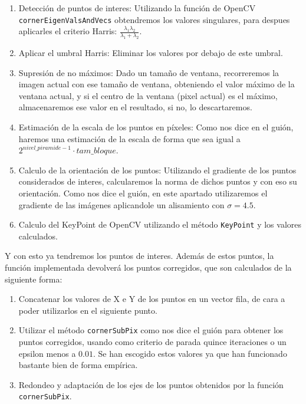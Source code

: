 \documentclass[12pt, spanish]{article}
\begin{document}
\begin{enumerate}
	\item Detección de puntos de interes: Utilizando la función de OpenCV \texttt{cornerEigenValsAndVecs}\cite{cornerCV} obtendremos los valores singulares, para despues aplicarles el criterio Harris: $\frac{\lambda_{1} \lambda_{2}}{\lambda_{1} + \lambda_{2}}$.
	\item Aplicar el umbral Harris: Eliminar los valores por debajo de este umbral.
	\item Supresión de no máximos: Dado un tamaño de ventana, recorreremos la imagen actual con ese tamaño de ventana, obteniendo el valor máximo de la ventana actual, y si el centro de la ventana (pixel actual) es el máximo, almacenaremos ese valor en el resultado, si no, lo descartaremos.
	\item Estimación de la escala de los puntos en píxeles: Como nos dice en el guión, haremos una estimación de la escala de forma que sea igual a $2^{nivel\_piramide - 1} \cdot tam\_bloque$.
	\item Calculo de la orientación de los puntos: Utilizando el gradiente de los puntos considerados de interes, calcularemos la norma de dichos puntos y con eso su orientación. Como nos dice el guión, en este apartado utilizaremos el gradiente de las imágenes aplicandole un alisamiento con $\sigma = 4.5$.
	\item Calculo del KeyPoint de OpenCV utilizando el método \texttt{KeyPoint} y los valores calculados.
\end{enumerate}

Y con esto ya tendremos los puntos de interes. Además de estos puntos, la función implementada devolverá los puntos corregidos, que son calculados de la siguiente forma:

\begin{enumerate}
	\item Concatenar los valores de X e Y de los puntos en un vector fila, de cara a poder utilizarlos en el siguiente punto.
	\item Utilizar el método \texttt{cornerSubPix} como nos dice el guión para obtener los puntos corregidos, usando como criterio de parada quince iteraciones o un epsilon menos a $0.01$. Se han escogido estos valores ya que han funcionado bastante bien de forma empírica.
	\item Redondeo y adaptación de los ejes de los puntos obtenidos por la función \texttt{cornerSubPix}.
\end{enumerate}
\end{document}
